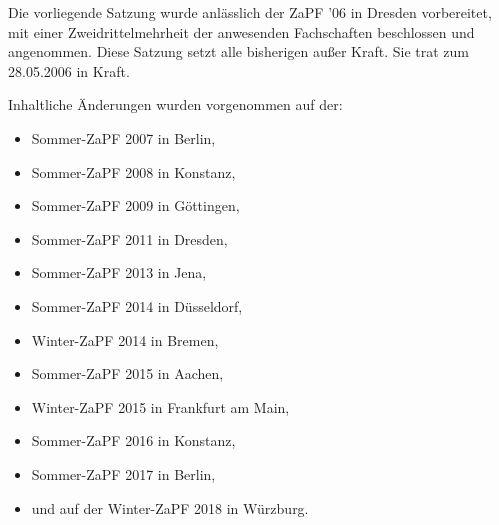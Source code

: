 \documentclass[12pt,oneside]{scrartcl}
\begin{document}
Die vorliegende Satzung wurde anlässlich der ZaPF '06 in Dresden vorbereitet,
mit einer Zweidrittelmehrheit der anwesenden Fachschaften beschlossen und
angenommen. Diese Satzung setzt alle bisherigen außer Kraft. Sie trat zum
28.05.2006 in Kraft.

Inhaltliche Änderungen wurden vorgenommen auf der:

\begin{itemize}
\item Sommer-ZaPF 2007 in Berlin,

\item Sommer-ZaPF 2008 in Konstanz,

\item Sommer-ZaPF 2009 in Göttingen,

\item Sommer-ZaPF 2011 in Dresden,

\item Sommer-ZaPF 2013 in Jena,

\item Sommer-ZaPF 2014 in Düsseldorf,

\item Winter-ZaPF 2014 in Bremen,

\item Sommer-ZaPF 2015 in Aachen,

\item Winter-ZaPF 2015 in Frankfurt am Main,

\item Sommer-ZaPF 2016 in Konstanz,

\item Sommer-ZaPF 2017 in Berlin,

\item und auf der Winter-ZaPF 2018 in Würzburg.
\end{itemize}
\end{document}
